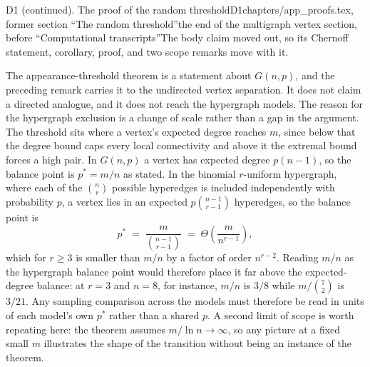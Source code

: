 \begin{offcut}{D1 (continued). The proof of the random threshold}{D1}{chapters/app\_proofs.tex, former section ``The random threshold''}{the end of the multigraph vertex section, before ``Computational transcripts''}{The body claim moved out, so its Chernoff statement, corollary, proof, and two scope remarks move with it.}
\begin{remark}\label{rem:threshold-scope}
The appearance-threshold theorem is a statement about $G(n,p)$, and the preceding remark carries it to the undirected vertex separation. It does not claim a directed analogue, and it does not reach the hypergraph models. The reason for the hypergraph exclusion is a change of scale rather than a gap in the argument. The threshold sits where a vertex's expected degree reaches $m$, since below that the degree bound caps every local connectivity and above it the extremal bound forces a high pair. In $G(n,p)$ a vertex has expected degree $p(n-1)$, so the balance point is $p^* = m/n$ as stated. In the binomial $r$-uniform hypergraph, where each of the $\binom{n}{r}$ possible hyperedges is included independently with probability $p$, a vertex lies in an expected $p\binom{n-1}{r-1}$ hyperedges, so the balance point is
\[
    p^* \;=\; \frac{m}{\binom{n-1}{r-1}} \;=\; \Theta\!\left(\frac{m}{n^{r-1}}\right),
\]
which for $r \ge 3$ is smaller than $m/n$ by a factor of order $n^{r-2}$. Reading $m/n$ as the hypergraph balance point would therefore place it far above the expected-degree balance: at $r = 3$ and $n = 8$, for instance, $m/n$ is $3/8$ while $m/\binom{7}{2}$ is $3/21$. Any sampling comparison across the models must therefore be read in units of each model's own $p^*$ rather than a shared $p$. A second limit of scope is worth repeating here: the theorem assumes $m/\ln n \to \infty$, so any picture at a fixed small $m$ illustrates the shape of the transition without being an instance of the theorem.
\end{remark}
\end{offcut}

